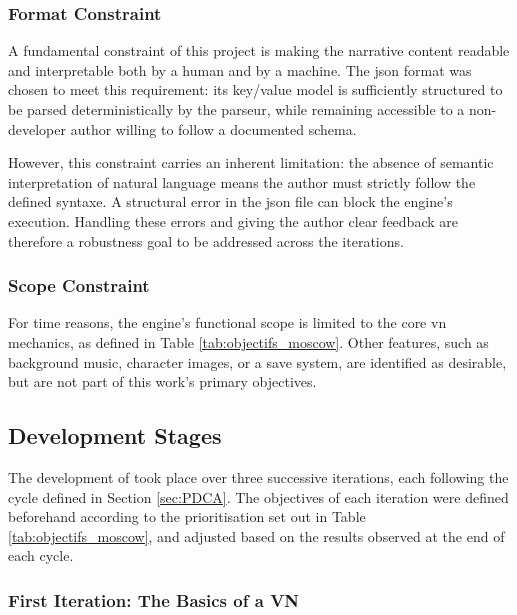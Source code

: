 \clearpage

\subsubsection{Format Constraint}

A fundamental constraint of this project is making the narrative content readable and interpretable both by a human and by a machine. The \gls{json} format was chosen to meet this requirement: its key/value model is sufficiently structured to be parsed deterministically by the \gls{parseur}, while remaining accessible to a non-developer author willing to follow a documented \gls{schema}.

However, this constraint carries an inherent limitation: the absence of semantic interpretation of natural language means the author must strictly follow the defined \gls{syntaxe}. A structural error in the \gls{json} file can block the engine's execution. Handling these errors and giving the author clear feedback are therefore a robustness goal to be addressed across the iterations.


\subsubsection{Scope Constraint}

For time reasons, the engine's functional scope is limited to the core \gls{vn} mechanics, as defined in Table \ref{tab:objectifs_moscow}. Other features, such as background music, character images, or a save system, are identified as desirable, but are not part of this work's primary objectives.


\subsection{Development Stages}

The development of \nsits took place over three successive iterations, each following the  cycle defined in Section \ref{sec:PDCA}. The objectives of each iteration were defined beforehand according to the  prioritisation set out in Table \ref{tab:objectifs_moscow}, and adjusted based on the results observed at the end of each cycle.


\subsubsection{First Iteration: The Basics of a VN}


